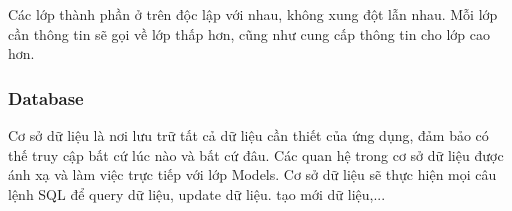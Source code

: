 Các lớp thành phần ở trên độc lập với nhau, không xung đột lẫn nhau. Mỗi lớp cần thông tin sẽ gọi về lớp thấp hơn, cũng như cung cấp thông tin cho lớp cao hơn.

\subsubsection{Database}
Cơ sở dữ liệu là nơi lưu trữ tất cả dữ liệu cần thiết của ứng dụng, đảm bảo có thế truy cập bất cứ lúc nào và bất cứ đâu. Các quan hệ trong cơ sở dữ liệu được ánh xạ và làm việc trực tiếp với lớp Models. Cơ sở dữ liệu sẽ thực hiện mọi câu lệnh SQL để query dữ liệu, update dữ liệu. tạo mới dữ liệu,...